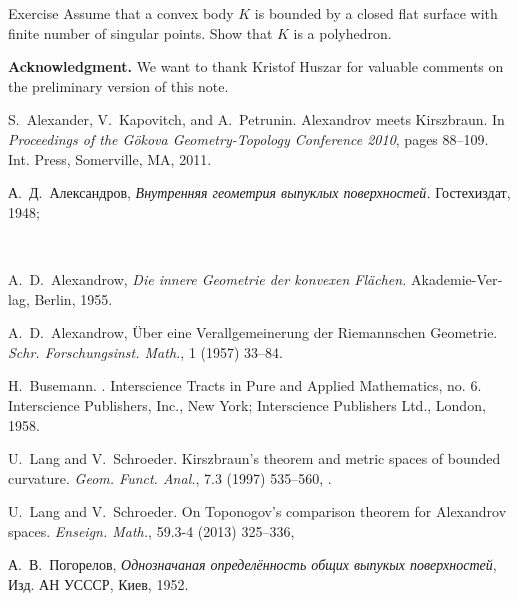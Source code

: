 \documentclass[oneside,a4paper, 12pt]{article}
\begin{document}
\begin{thm}{Exercise}
Assume that a convex body $K$ is bounded by a closed flat surface with finite number of singular points.
Show that $K$ is a polyhedron.
\end{thm}


\bigskip
\textbf{Acknowledgment.}
We want to thank Kristof Huszar for valuable comments on the preliminary version of this note. 




\begin{thebibliography}{52}

S.~Alexander, V.~Kapovitch, and A.~Petrunin.
\newblock Alexandrov meets {K}irszbraun.
\newblock In {\em Proceedings of the {G}\"okova {G}eometry-{T}opology
  {C}onference 2010}, pages 88--109. Int. Press, Somerville, MA, 2011.

\begin{otherlanguage}{russian}
А.~Д.~Александров,
\emph{Внутренняя геометрия выпуклых поверхностей.} 
Гостехиздат, 1948;
\end{otherlanguage}\\
\begin{otherlanguage}{german}
A.~D.~Alexandrow, \emph{Die innere Geometrie der konvexen Fl\"achen.} 
Akademie-Verlag, Berlin, 1955.
\end{otherlanguage}

A.~D.~Alexandrow,
\"Uber eine Verallgemeinerung der Riemannschen Geometrie.
\emph{Schr. Forschungsinst. Math.},
1 (1957) 33--84.

H.~Busemann.
.
\newblock Interscience Tracts in Pure and Applied Mathematics, no. 6.
  Interscience Publishers, Inc., New York; Interscience Publishers Ltd.,
  London, 1958.

U.~Lang and V.~Schroeder.
\newblock Kirszbraun's theorem and metric spaces of bounded curvature.
\newblock \emph{Geom. Funct. Anal.}, 7.3 (1997) 535--560, .

U.~Lang and V.~Schroeder.
\newblock On {T}oponogov's comparison theorem for {A}lexandrov spaces.
\newblock \emph{Enseign. Math.}, 59.3-4 (2013) 325--336,

\begin{otherlanguage}{russian}
А.~В.~Погорелов,
\emph{Однозначаная определённость общих выпукых поверхностей},
Изд. АН УСССР, Киев, 1952.
\end{otherlanguage}


\end{thebibliography}
\end{document}
